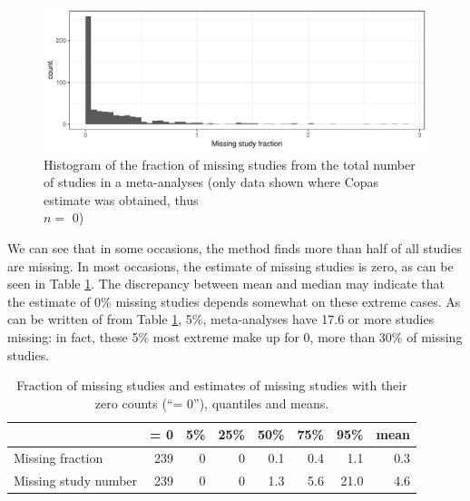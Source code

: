 \documentclass[11pt,a4paper,twoside]{book}\usepackage[]{graphicx}\usepackage[]{color}
\newenvironment{knitrout}{}{} %
\begin{document}
\begin{figure}
\begin{knitrout}
\color{fgcolor}

{\centering \includegraphics[width=\textwidth-3cm]{figure/ch03_figunnamed-chunk-20-1} 

}



\end{knitrout}
\caption{Histogram of the fraction of missing studies from the total number of studies in a meta-analyses (only data shown where Copas estimate was obtained, thus \\$n =$ 0)}
\label{fig:copas.missing}
\end{figure}

We can see that in some occasions, the method finds more than half of all studies are missing. In most occasions, the estimate of missing studies is zero, as can be seen in Table \ref{copas.missing}. The discrepancy between mean and median may indicate that the estimate of 0\% missing studies depends somewhat on these extreme cases. As can be written of from Table \ref{copas.missing}, 5\%,  meta-analyses have 17.6 or more studies missing: in fact, these 5\% most extreme make up for 0, more than 30\% of missing studies.

\begin{table}[ht]
\centering
\begingroup\footnotesize
\begin{tabular}{lrrrrrrr}
  \hline
 & = 0 & 5\% & 25\% & 50\% & 75\% & 95\% & mean \\ 
  \hline
Missing fraction & 239 & 0 & 0 & 0.1 & 0.4 & 1.1 & 0.3 \\ 
  Missing study number & 239 & 0 & 0 & 1.3 & 5.6 & 21.0 & 4.6 \\ 
   \hline
\end{tabular}
\endgroup
\caption{Fraction of missing studies and estimates of missing studies with their zero counts (``= 0''), quantiles and means.} 
\label{copas.missing}
\end{table}
\end{document}
